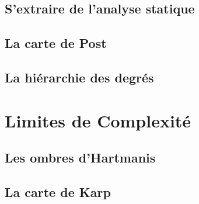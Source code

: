 \documentclass[9pt]{beamer}
\begin{document}
\subsection{S'extraire de l'analyse statique}










 
\subsection{La carte de Post}






 
\subsection{La hiérarchie des degrés}




 
\section{Limites de Complexité}
 
\subsection{Les ombres d'Hartmanis}
 








 
\subsection{La carte de Karp}







 
\end{document}
